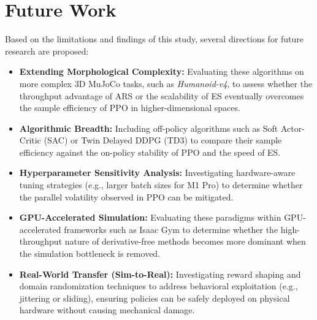 \section{Future Work}

Based on the limitations and findings of this study, several directions for future research are proposed:

\begin{itemize}
    \item \textbf{Extending Morphological Complexity:} Evaluating these algorithms on more complex 3D MuJoCo tasks, such as \textit{Humanoid-v4}, to assess whether the throughput advantage of ARS or the scalability of ES eventually overcomes the sample efficiency of PPO in higher-dimensional spaces.
    \item \textbf{Algorithmic Breadth:} Including off-policy algorithms such as Soft Actor-Critic (SAC) or Twin Delayed DDPG (TD3) to compare their sample efficiency against the on-policy stability of PPO and the speed of ES.
    \item \textbf{Hyperparameter Sensitivity Analysis:} Investigating hardware-aware tuning strategies (e.g., larger batch sizes for M1 Pro) to determine whether the parallel volatility observed in PPO can be mitigated.
    \item \textbf{GPU-Accelerated Simulation:} Evaluating these paradigms within GPU-accelerated frameworks such as Isaac Gym to determine whether the high-throughput nature of derivative-free methods becomes more dominant when the simulation bottleneck is removed.
    \item \textbf{Real-World Transfer (Sim-to-Real):} Investigating reward shaping and domain randomization techniques to address behavioral exploitation (e.g., jittering or sliding), ensuring policies can be safely deployed on physical hardware without causing mechanical damage.
\end{itemize}

\clearpage
\null %
\clearpage